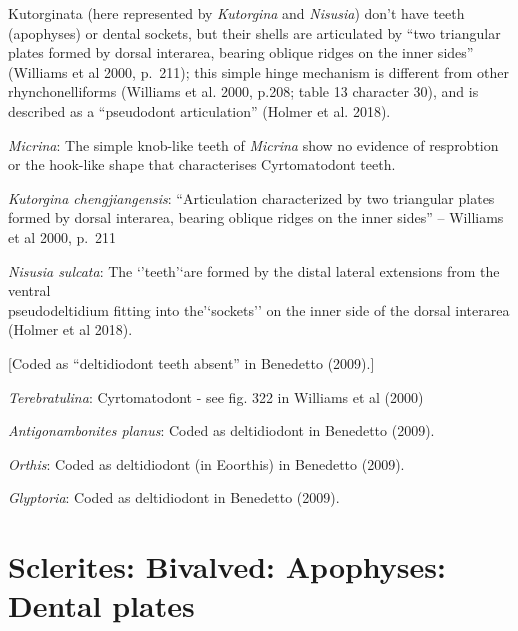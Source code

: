 \documentclass[]{book}
\theoremstyle{definition}
\theoremstyle{definition}
\theoremstyle{definition}
\theoremstyle{remark}
\begin{document}
Kutorginata (here represented by \emph{Kutorgina} and \emph{Nisusia})
don't have teeth (apophyses) or dental sockets, but their shells are
articulated by ``two triangular plates formed by dorsal interarea,
bearing oblique ridges on the inner sides'' (Williams et al 2000,
p.~211); this simple hinge mechanism is different from other
rhynchonelliforms (Williams et al. 2000, p.208; table 13 character 30),
and is described as a ``pseudodont articulation'' (Holmer et al. 2018).

\emph{Micrina}: The simple knob-like teeth of \emph{Micrina} show no
evidence of resprobtion or the hook-like shape that characterises
Cyrtomatodont teeth.

\emph{Kutorgina chengjiangensis}: ``Articulation characterized by two
triangular plates formed by dorsal interarea, bearing oblique ridges on
the inner sides'' -- Williams et al 2000, p.~211

\emph{Nisusia sulcata}: The `'teeth'`are formed by the distal lateral
extensions from the ventral\\
pseudodeltidium fitting into the'`sockets'' on the inner side of the
dorsal interarea (Holmer et al 2018).

{[}Coded as ``deltidiodont teeth absent'' in Benedetto (2009).{]}

\emph{Terebratulina}: Cyrtomatodont - see fig. 322 in Williams et al
(2000)

\emph{Antigonambonites planus}: Coded as deltidiodont in Benedetto
(2009).

\emph{Orthis}: Coded as deltidiodont (in Eoorthis) in Benedetto (2009).

\emph{Glyptoria}: Coded as deltidiodont in Benedetto (2009).

\hypertarget{sclerites-bivalved-apophyses-dental-plates}{%
\section*{Sclerites: Bivalved: Apophyses: Dental
plates}\label{sclerites-bivalved-apophyses-dental-plates}}
\end{document}
